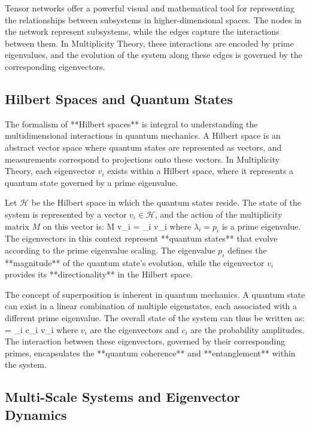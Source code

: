 \documentclass[12pt]{article}
\begin{document}
Tensor networks offer a powerful visual and mathematical tool for representing the relationships between subsystems in higher-dimensional spaces. The nodes in the network represent subsystems, while the edges capture the interactions between them. In Multiplicity Theory, these interactions are encoded by prime eigenvalues, and the evolution of the system along these edges is governed by the corresponding eigenvectors.

\subsection{Hilbert Spaces and Quantum States}

The formalism of **Hilbert spaces** is integral to understanding the multidimensional interactions in quantum mechanics. A Hilbert space is an abstract vector space where quantum states are represented as vectors, and measurements correspond to projections onto these vectors. In Multiplicity Theory, each eigenvector \( v_i \) exists within a Hilbert space, where it represents a quantum state governed by a prime eigenvalue.

Let \( \mathcal{H} \) be the Hilbert space in which the quantum states reside. The state of the system is represented by a vector \( v_i \in \mathcal{H} \), and the action of the multiplicity matrix \( M \) on this vector is:
\]
M v_i = \lambda_i v_i
\]
where \( \lambda_i = p_i \) is a prime eigenvalue. The eigenvectors in this context represent **quantum states** that evolve according to the prime eigenvalue scaling. The eigenvalue \( p_i \) defines the **magnitude** of the quantum state’s evolution, while the eigenvector \( v_i \) provides its **directionality** in the Hilbert space.

The concept of superposition is inherent in quantum mechanics. A quantum state can exist in a linear combination of multiple eigenstates, each associated with a different prime eigenvalue. The overall state of the system can thus be written as:
\]
\Psi = \sum_i c_i v_i
\]
where \( v_i \) are the eigenvectors and \( c_i \) are the probability amplitudes. The interaction between these eigenvectors, governed by their corresponding primes, encapsulates the **quantum coherence** and **entanglement** within the system.

\subsection{Multi-Scale Systems and Eigenvector Dynamics}
\end{document}

